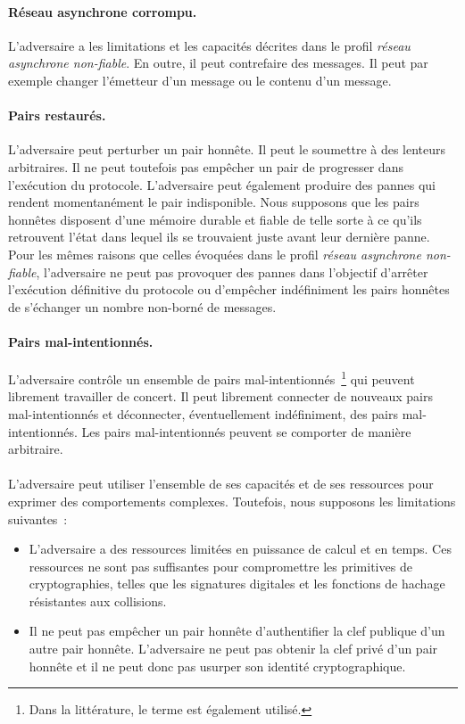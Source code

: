 \paragraph{Réseau asynchrone corrompu.} L'adversaire a les limitations et les capacités décrites dans le profil \emph{réseau asynchrone non-fiable}.
En outre, il peut contrefaire des messages.
Il peut par exemple changer l'émetteur d'un message ou le contenu d'un message.

\paragraph{Pairs restaurés.} L'adversaire peut perturber un pair honnête.
Il peut le soumettre à des lenteurs arbitraires.
Il ne peut toutefois pas empêcher un pair de progresser dans l'exécution du protocole.
L'adversaire peut également produire des pannes qui rendent momentanément le pair indisponible.
Nous supposons que les pairs honnêtes disposent d'une mémoire durable et fiable de telle sorte à ce qu'ils retrouvent l'état dans lequel ils se trouvaient juste avant leur dernière panne.
Pour les mêmes raisons que celles évoquées dans le profil \emph{réseau asynchrone non-fiable}, l'adversaire ne peut pas provoquer des pannes dans l'objectif d'arrêter l'exécution définitive du protocole ou d'empêcher indéfiniment les pairs honnêtes de s'échanger un nombre non-borné de messages.

\paragraph{Pairs mal-intentionnés.} L'adversaire contrôle un ensemble de pairs mal-intentionnés~\footnote{Dans la littérature, le terme  est également utilisé.} qui peuvent librement travailler de concert.
Il peut librement connecter de nouveaux pairs mal-intentionnés et déconnecter, éventuellement indéfiniment, des pairs mal-intentionnés. Les pairs mal-intentionnés peuvent se comporter de manière arbitraire.

\paragraph{}L'adversaire peut utiliser l'ensemble de ses capacités et de ses ressources pour exprimer des comportements complexes.
Toutefois, nous supposons les limitations suivantes~:

\begin{itemize}
  \item L'adversaire a des ressources limitées en puissance de calcul et en temps.
  Ces ressources ne sont pas suffisantes pour compromettre les primitives de cryptographies, telles que les signatures digitales et les fonctions de hachage résistantes aux collisions.
  \item Il ne peut pas empêcher un pair honnête d'authentifier la clef publique d'un autre pair honnête.
  L'adversaire ne peut pas obtenir la clef privé d'un pair honnête et il ne peut donc pas usurper son identité cryptographique.
\end{itemize}

